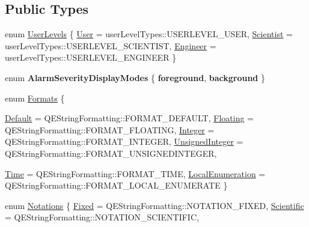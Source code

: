\subsection*{Public Types}
\begin{DoxyCompactItemize}
\item 
enum \hyperlink{classQEAnalogProgressBar_a5afb1b38e0d5ffd01e4ce13e621aaee2}{UserLevels} \{ \hyperlink{classQEAnalogProgressBar_a5afb1b38e0d5ffd01e4ce13e621aaee2a87bbda8f92ccf5225993505e36c69c7f}{User} =  userLevelTypes::USERLEVEL\_\-USER, 
\hyperlink{classQEAnalogProgressBar_a5afb1b38e0d5ffd01e4ce13e621aaee2a410d2ac050fd339be41405ad384d77a1}{Scientist} =  userLevelTypes::USERLEVEL\_\-SCIENTIST, 
\hyperlink{classQEAnalogProgressBar_a5afb1b38e0d5ffd01e4ce13e621aaee2ad3a6c7e039b3c8ac1a7337c750bdae00}{Engineer} =  userLevelTypes::USERLEVEL\_\-ENGINEER
 \}
\item 
enum {\bfseries AlarmSeverityDisplayModes} \{ {\bfseries foreground}, 
{\bfseries background}
 \}
\item 
enum \hyperlink{classQEAnalogProgressBar_a0bd08d4a064f4e1ee8cd62ac057a1e63}{Formats} \{ \par
\hyperlink{classQEAnalogProgressBar_a0bd08d4a064f4e1ee8cd62ac057a1e63a2d57d196c3fc158096cece8221db7918}{Default} =  QEStringFormatting::FORMAT\_\-DEFAULT, 
\hyperlink{classQEAnalogProgressBar_a0bd08d4a064f4e1ee8cd62ac057a1e63a2c81774056dab1085bae5e42880f4679}{Floating} =  QEStringFormatting::FORMAT\_\-FLOATING, 
\hyperlink{classQEAnalogProgressBar_a0bd08d4a064f4e1ee8cd62ac057a1e63af8aa0d93a1307b224455a7019a090817}{Integer} =  QEStringFormatting::FORMAT\_\-INTEGER, 
\hyperlink{classQEAnalogProgressBar_a0bd08d4a064f4e1ee8cd62ac057a1e63a86958b522041969fa6085cd531144d48}{UnsignedInteger} =  QEStringFormatting::FORMAT\_\-UNSIGNEDINTEGER, 
\par
\hyperlink{classQEAnalogProgressBar_a0bd08d4a064f4e1ee8cd62ac057a1e63ad7ed1c17974f50e5981d4ca7e8480591}{Time} =  QEStringFormatting::FORMAT\_\-TIME, 
\hyperlink{classQEAnalogProgressBar_a0bd08d4a064f4e1ee8cd62ac057a1e63ae351aa7729da709cd9a297260631c979}{LocalEnumeration} =  QEStringFormatting::FORMAT\_\-LOCAL\_\-ENUMERATE
 \}
\item 
enum \hyperlink{classQEAnalogProgressBar_ac1a7dd3ab8de2cb168bac300d43366bd}{Notations} \{ \hyperlink{classQEAnalogProgressBar_ac1a7dd3ab8de2cb168bac300d43366bda578d5fe7e0dcdf34385cc3c6399797c6}{Fixed} =  QEStringFormatting::NOTATION\_\-FIXED, 
\hyperlink{classQEAnalogProgressBar_ac1a7dd3ab8de2cb168bac300d43366bda447fb6fbe79147c0fb1204e0c0603689}{Scientific} =  QEStringFormatting::NOTATION\_\-SCIENTIFIC, 

\end{DoxyCompactItemize}
